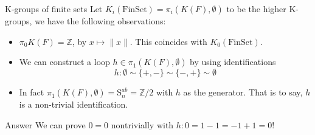 \documentclass[12pt]{beamer}
\begin{document}
\begin{frame}{K-groups of finite sets}
  Let $ K_i(\mathrm{FinSet})= \pi_i (K(F),\emptyset)$ to be the higher K-groups, we have the following observations:
  \pause
  \begin{itemize}
    \item $\pi_0 K(F) = \mathbb{Z}$, by $ x \mapsto \|x\|$. This coincides with $K_0(\mathrm{FinSet})$. 
      \pause
    \item We can construct a loop $h \in \pi_1 (K(F),\emptyset) $ by using identifications 
      \[
        h: \emptyset \sim \{+,-\} \sim \{-,+\} \sim \emptyset
      \]
      \pause
    \item In fact $\pi_1 (K(F),\emptyset)= \mathrm{S}_n^{ab}=\mathbb{Z}/2 $ with $h$ as the generator. That is to say, $h$ is a non-trivial identification. 
  \end{itemize}
  \pause
  \begin{block}{Answer}
    We can prove $0=0$ nontrivially with $h: 0=1-1=-1+1=0$!
  \end{block}
\end{frame}
  
\end{document}

